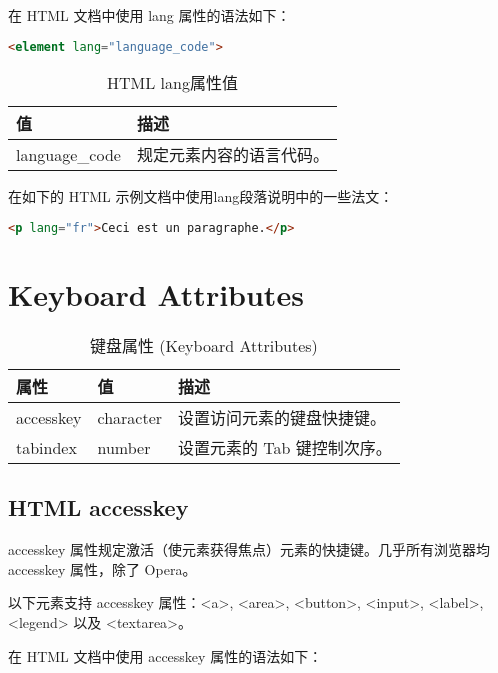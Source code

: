 在 HTML 文档中使用 lang 属性的语法如下：

\begin{lstlisting}[language=HTML]
<element lang="language_code">
\end{lstlisting}

\begin{table}[!h]
\centering
\vspace{-10pt}
\caption{HTML lang属性值}
\label{html_lang_attribute}
\begin{tabular}{|m{80pt}|m{290pt}|}
\hline
值	&描述\\
\hline
language\_code	&规定元素内容的语言代码。\\
\hline
\end{tabular}
\end{table}

在如下的 HTML 示例文档中使用lang段落说明中的一些法文：

\begin{lstlisting}[language=HTML]
<p lang="fr">Ceci est un paragraphe.</p>
\end{lstlisting}

\clearpage

\section{Keyboard Attributes}


\begin{table}[!h]
\centering
\caption{键盘属性 (Keyboard Attributes)}
\begin{tabular}{|m{80pt}|m{90pt}|m{200pt}|}
\hline
属性			&值			&描述\\
\hline
accesskey	&character	&设置访问元素的键盘快捷键。\\
\hline
tabindex	&number		&设置元素的 Tab 键控制次序。\\
\hline
\end{tabular}
\end{table}




\subsection{HTML accesskey}

accesskey 属性规定激活（使元素获得焦点）元素的快捷键。几乎所有浏览器均 accesskey 属性，除了 Opera。

以下元素支持 accesskey 属性：<a>, <area>, <button>, <input>, <label>, <legend> 以及 <textarea>。

在 HTML 文档中使用 accesskey 属性的语法如下：

